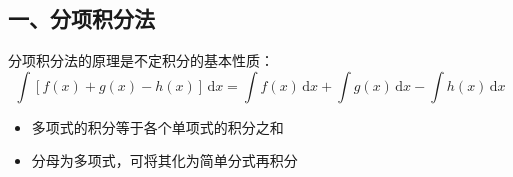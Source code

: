 
\begin{issues}
\issueDraft
\end{issues}


\subsection{一、分项积分法}
分项积分法的原理是不定积分的基本性质：
$$\int \left[f(x)+g(x)-h(x)\right]\,\mathrm{d}x=\int f(x)\,\mathrm{d}x+\int g(x)\,\mathrm{d}x-\int h(x)\,\mathrm{d}x$$

\begin{itemize}
\item 多项式的积分等于各个单项式的积分之和
\end{itemize}
\begin{itemize}
\item 分母为多项式，可将其化为简单分式再积分
\end{itemize}

